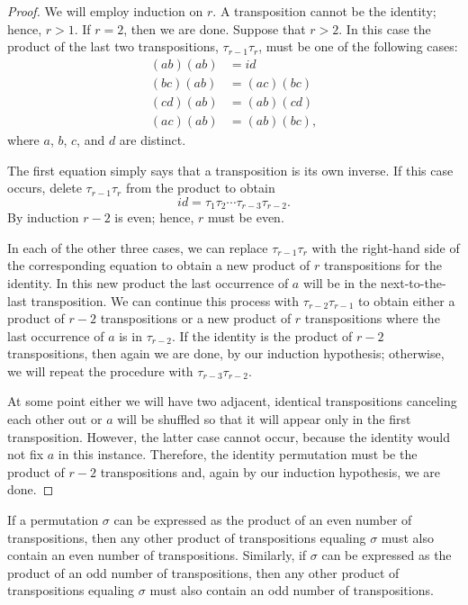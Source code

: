 \begin{proof}
We will employ  induction  on $r$.  A transposition cannot be the
identity; hence,   $r > 1$. If $r=2$, then we are done. Suppose that
$r > 2$. In this case the product of the last two transpositions,
$\tau_{r-1} \tau_r$, must be one of the following cases: 
\begin{align*}
(a b)(a b) & = id \\
(b c)(a b) & = (a c)(b c) \\
(c d)(a b) & = (a b)(c d) \\
(a c)(a b) & = (a b)(b c),
\end{align*}
where $a$, $b$, $c$, and $d$ are distinct.

The first equation simply says that a transposition is its own
inverse. If this case occurs, delete $\tau_{r-1} \tau_r$ from the 
product to obtain 
\[
id = \tau_1 \tau_2 \cdots \tau_{r-3} \tau_{r-2}.
\]
By induction $r - 2$ is even; hence, $r$ must be even.
 
In each of the other three cases, we can replace $\tau_{r - 1} \tau_r$ 
with the right-hand side of the corresponding equation to obtain a new
product of $r$ transpositions for the identity. In this new product
the last occurrence of $a$ will be in the next-to-the-last
transposition. We can continue this process with $\tau_{r - 2}
\tau_{r-1}$ to obtain either a product of $r-2$ transpositions or a
new product of $r$ transpositions where the last occurrence of $a$ is
in $\tau_{r-2}$. If the identity is the product of $r-2$
transpositions, then again we are done, by our induction hypothesis;
otherwise, we will repeat the procedure with $\tau_{r-3} \tau_{r-2}$.

At some point either we will have two adjacent, identical
transpositions canceling each other out or $a$ will be shuffled 
so that it will appear only in the first transposition. However, the
latter case cannot occur, because the identity would not fix $a$ in
this instance. Therefore, the identity permutation must be the product
of $r-2$ transpositions and, again by our induction hypothesis, we are
done. 
\end{proof}

\begin{theorem}\label{even_and_odd}
If a permutation $\sigma$ can be expressed as the product of an even
number of transpositions, then any other product of transpositions
equaling $\sigma$ must also contain an even number of transpositions.
Similarly, if $\sigma$ can be expressed as the product of an odd
number of transpositions, then any other product of transpositions
equaling $\sigma$ must also contain an odd number of transpositions. 
\end{theorem}


